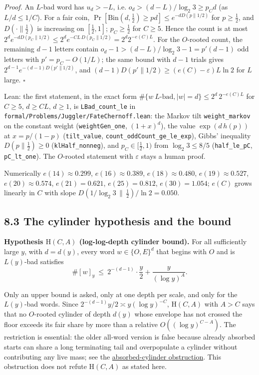 \documentclass[11pt,a4paper]{article}
\begin{document}
\emph{Proof.} An \(L\)-bad word has \(u_d>-L\), i.e.
\(o_d>(d-L)/\log_2 3\ge p_Cd\) (as \(L/d\le 1/C\)). For a fair coin,
\(\Pr[\mathrm{Bin}(d,\tfrac12)\ge pd]\le e^{-dD(p\|1/2)}\) for
\(p\ge\tfrac12\), and \(D(\cdot\|\tfrac12)\) is increasing on
\([\tfrac12,1]\); \(p_C\ge\tfrac12\) for \(C\ge 5\). Hence the count is
at most
\(2^de^{-dD(p_C\|1/2)}\le 2^de^{-CL\,D(p_C\|1/2)}=2^d2^{-e(C)L}\). For
the \(O\)-rooted count, the remaining \(d-1\) letters contain
\(o_d-1>(d-L)/\log_2 3-1=p'(d-1)\) odd letters with \(p'=p_C-O(1/L)\);
the same bound with \(d-1\) trials gives
\(2^{d-1}e^{-(d-1)D(p'\|1/2)}\), and
\((d-1)D(p'\|1/2)\ge(e(C)-\varepsilon)L\ln 2\) for \(L\) large.
\(\square\)

Lean: the first statement, in the exact form
\(\#\{w\ L\text{-bad},|w|=d\}\le 2^d\,2^{-e(C)L}\) for \(C\ge 5\),
\(d\ge CL\), \(d\ge 1\), is \texttt{\nolinkurl{LBad_count_le}} in
\texttt{\nolinkurl{formal/Problems/Juggler/FateChernoff.lean}}: the
Markov tilt \texttt{\nolinkurl{weight_markov}} on the constant weight
(\texttt{\nolinkurl{weightGen_one}}, \((1+x)^d\)), the value
\(\exp(d\,h(p))\) at \(x=p/(1-p)\) (\texttt{\nolinkurl{tilt_value}},
\texttt{\nolinkurl{count_oddCount_ge_le_exp}}), Gibbs' inequality
\(D(p\|\tfrac12)\ge 0\) (\texttt{\nolinkurl{klHalf_nonneg}}), and
\(p_C\in[\tfrac12,1)\) from \(\log_2 3\le 8/5\)
(\texttt{\nolinkurl{half_le_pC}}, \texttt{\nolinkurl{pC_lt_one}}). The
\(O\)-rooted statement with \(\varepsilon\) stays a human proof.

Numerically \(e(14)\approx0.299\), \(e(16)\approx0.389\),
\(e(18)\approx0.480\), \(e(19)\approx0.527\), \(e(20)\approx0.574\),
\(e(21)=0.621\), \(e(25)=0.812\), \(e(30)=1.054\); \(e(C)\) grows
linearly in \(C\) with slope
\(D(1/\log_2 3\,\|\,\tfrac12)/\ln 2=0.050\).

\subsection{8.3 The cylinder hypothesis and the
bound}\label{the-cylinder-hypothesis-and-the-bound}

\textbf{Hypothesis \(\mathrm H(C,A)\) (log-log-depth cylinder bound).}
For all sufficiently large \(y\), with \(d=d(y)\), every word
\(w\in\{O,E\}^d\) that begins with \(O\) and is \(L(y)\)-bad satisfies
\[
\#[w]_y\ \le\ 2^{-(d-1)}\cdot\frac y2+\frac{y}{(\log y)^{A}} .
\]

Only an upper bound is asked, only at one depth per scale, and only for
the \(L(y)\)-bad words. Since \(2^{-(d-1)}y/2\asymp y(\log y)^{-C}\),
\(\mathrm H(C,A)\) with \(A>C\) says that no \(O\)-rooted cylinder of
depth \(d(y)\) whose envelope has not crossed the floor exceeds its fair
share by more than a relative \(O((\log y)^{C-A})\). The restriction is
essential: the older all-word version is false because already absorbed
starts can share a long terminating tail and overpopulate a cylinder
without contributing any live mass; see the
\href{https://github.com/sneakyweasel/btlab/blob/main/docs/problems/juggler_absorbed_cylinder.md}{absorbed-cylinder
obstruction}. This obstruction does not refute \(\mathrm H(C,A)\) as
stated here.
\end{document}
